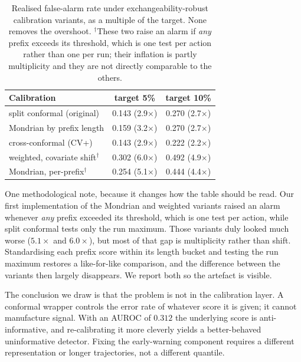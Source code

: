 \documentclass{article}
\begin{document}
\begin{table}[t]
\caption{Realised false-alarm rate under exchangeability-robust calibration variants, as a multiple of the target. None removes the overshoot. $^\dagger$These two raise an alarm if \emph{any} prefix exceeds its threshold, which is one test per action rather than one per run; their inflation is partly multiplicity and they are not directly comparable to the others.}
\label{tab:conformal}
\vskip 0.1in
\begin{center}\begin{small}
\begin{tabular}{lcc}
\toprule
Calibration & target 5\% & target 10\% \\
\midrule
split conformal (original) & 0.143 (2.9$\times$) & 0.270 (2.7$\times$) \\
Mondrian by prefix length & 0.159 (3.2$\times$) & 0.270 (2.7$\times$) \\
cross-conformal (CV+) & 0.143 (2.9$\times$) & 0.222 (2.2$\times$) \\
weighted, covariate shift$^\dagger$ & 0.302 (6.0$\times$) & 0.492 (4.9$\times$) \\
Mondrian, per-prefix$^\dagger$ & 0.254 (5.1$\times$) & 0.444 (4.4$\times$) \\
\bottomrule
\end{tabular}
\end{small}\end{center}
\vskip -0.1in
\end{table}

One methodological note, because it changes how the table should be read. Our first implementation of the Mondrian and weighted variants raised an alarm whenever \emph{any} prefix exceeded its threshold, which is one test per action, while split conformal tests only the run maximum. Those variants duly looked much worse ($5.1\times$ and $6.0\times$), but most of that gap is multiplicity rather than shift. Standardising each prefix score within its length bucket and testing the run maximum restores a like-for-like comparison, and the difference between the variants then largely disappears. We report both so the artefact is visible.

The conclusion we draw is that the problem is not in the calibration layer. A conformal wrapper controls the error rate of whatever score it is given; it cannot manufacture signal. With an AUROC of $0.312$ the underlying score is anti-informative, and re-calibrating it more cleverly yields a better-behaved uninformative detector. Fixing the early-warning component requires a different representation or longer trajectories, not a different quantile.
\end{document}
